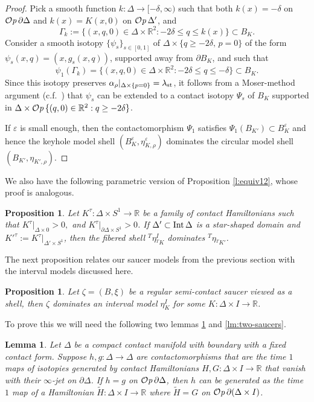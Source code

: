 \documentclass[12pt]{paper}
\theoremstyle{plain}
\newtheorem{proposition}[theorem]{Proposition}
\newtheorem{prop}[theorem]{Proposition}
\newtheorem{lemma}[theorem]{Lemma}
\theoremstyle{definition}
\newcommand{\wt}{\widetilde}
\newcommand{\p}{\partial}
\newcommand{\eps}{\varepsilon}
\newcommand{\R}{{\mathbb{R}}}
\newcommand{\st}{{\rm st}}
\newcommand{\Int}{{\rm Int\,}} %
\def\Op{{\mathcal O}{\it p}\,}
\numberwithin{figure}{section}
\begin{document}
\begin{proof}
	 Pick a smooth function $k: \Delta \to [-\delta, \infty)$ such that both $k(x) = -\delta$ on $\Op \p \Delta$
	 and $k(x) = K(x,0)$ on $\Op \Delta'$, and 
	 $$
	 	\Gamma_k := \{(x, q, 0) \in \Delta \times \R^2 : -2\delta \leq q \leq k(x)\} \subset B_K.
	 $$
	 Consider a smooth isotopy $\{\psi_s\}_{s \in [0,1]}$ of $\Delta \times \{q \geq -2\delta,\, p = 0\}$ 
	 of the form $\psi_s(x,q) = (x, g_s(x,q))$, supported away from $\p B_K$, and such that
	 $$
	 	\psi_1(\Gamma_k) = \{(x, q, 0) \in \Delta \times \R^2 : -2\delta \leq q \leq -\delta\} \subset B_K.
	 $$
	Since this isotopy preserves $\alpha_\rho|_{\Delta \times \{p=0\}}  = \lambda_{\st}$, it follows from a Moser-method
	argument (c.f.\ \cite[Theorem 2.6.13]{Gei08}) that $\psi_s$ can be extended to a  contact isotopy $\Psi_s$ of $B_K$  supported in 
	$\Delta \times \Op\{(q,0) \in \R^2: q \geq -2\delta\}$.
	
	If $\eps$ is small enough, then the contactomorphism $\Psi_1$ satisfies $\Psi_1(B_{K'})\subset B_K^\eps$
	and hence the keyhole model shell $(B_K^\eps,\eta^\eps_{K, \rho})$ dominates  the circular model shell 
	$(B_{K'}, \eta_{K', \rho})$.
\end{proof}	 
 
We also have the following parametric version of  Proposition \ref{l:equiv12}, whose proof is analogous.
\begin{prop}\label{l:equiv12-param}
	Let $K^\tau : \Delta \times S^1 \to \R$ be a family of contact Hamiltonians  such that 
	$K^\tau|_{\Delta \times 0} > 0, $ and  $K^\tau|_{\p \Delta \times S^1} > 0$. If
	$\Delta' \subset \Int \Delta$ is a star-shaped domain and $K'^{\tau}:= K^\tau|_{\Delta' \times S^1}$,  
	then the fibered  shell $^{T}\eta^I_{{}^T\!K}$ dominates  ${}^T\eta_{{}^T\! K'}$.  
\end{prop}

 
 
The next proposition relates our saucer models from the previous section with the interval models discussed here.  
\begin{proposition} \label{lm: saucer dom interval}
Let $\zeta = (B, \xi)$ be a regular semi-contact saucer viewed as a shell,
then $\zeta$ dominates an interval model $\eta^I_K$ for some $K:\Delta\times I \to \R$.
\end{proposition}
To prove this we will need the following two lemmas \ref{lm:boundary-behavior} and  \ref{lm:two-saucers}.

\begin{lemma}\label{lm:boundary-behavior}
Let $\Delta$ be a compact contact manifold with boundary with a fixed contact form.
Suppose $h, g:\Delta\to\Delta$ are contactomorphisms that are the time $1$ maps of isotopies
generated by contact Hamiltonians $H,G:\Delta\times I\to\R$ that vanish with their $\infty$-jet on $\p\Delta$.
If $h=g$ on $\Op\p \Delta$, then $h$ can be generated as the time $1$ map of a Hamiltonian $\wt H:\Delta\times I\to\R$
where $\wt H=G$ on $ \Op\p(\Delta \times I)$.
\end{lemma} 
\end{document}
